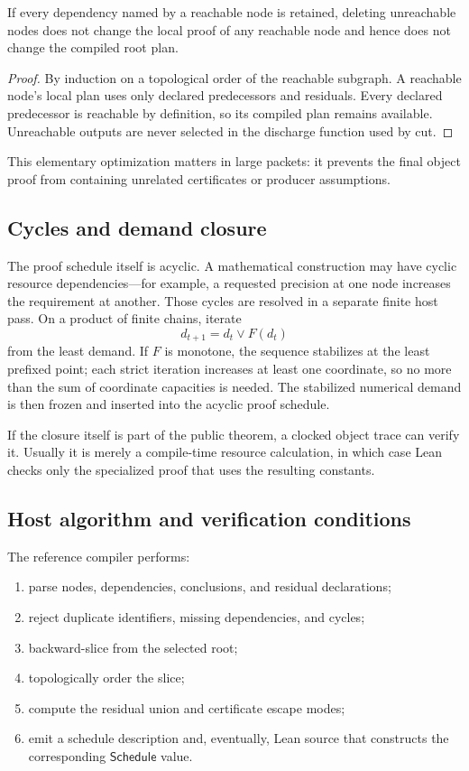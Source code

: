 \begin{lemma}
If every dependency named by a reachable node is retained, deleting unreachable nodes does not
change the local proof of any reachable node and hence does not change the compiled root plan.
\end{lemma}

\begin{proof}
By induction on a topological order of the reachable subgraph.  A reachable node's local plan uses
only declared predecessors and residuals.  Every declared predecessor is reachable by definition,
so its compiled plan remains available.  Unreachable outputs are never selected in the discharge
function used by cut.
\end{proof}

This elementary optimization matters in large packets: it prevents the final object proof from
containing unrelated certificates or producer assumptions.

\subsection{Cycles and demand closure}

The proof schedule itself is acyclic.  A mathematical construction may have cyclic resource
dependencies---for example, a requested precision at one node increases the requirement at another.
Those cycles are resolved in a separate finite host pass.  On a product of finite chains, iterate
\[
 d_{t+1}=d_t\vee F(d_t)
\]
from the least demand.  If \(F\) is monotone, the sequence stabilizes at the least prefixed point;
each strict iteration increases at least one coordinate, so no more than the sum of coordinate
capacities is needed.  The stabilized numerical demand is then frozen and inserted into the acyclic
proof schedule.

If the closure itself is part of the public theorem, a clocked object trace can verify it.  Usually it
is merely a compile-time resource calculation, in which case Lean checks only the specialized proof
that uses the resulting constants.

\subsection{Host algorithm and verification conditions}

The reference compiler performs:

\begin{enumerate}
\item parse nodes, dependencies, conclusions, and residual declarations;
\item reject duplicate identifiers, missing dependencies, and cycles;
\item backward-slice from the selected root;
\item topologically order the slice;
\item compute the residual union and certificate escape modes;
\item emit a schedule description and, eventually, Lean source that constructs the corresponding
      \(\mathsf{Schedule}\) value.
\end{enumerate}

